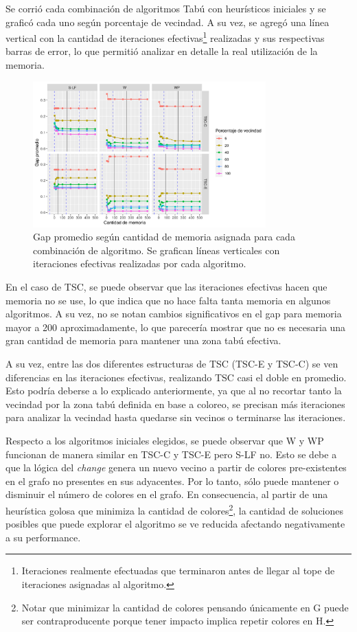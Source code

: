 Se corrió cada combinación de algoritmos Tabú con heurísticos iniciales y se graficó cada uno según porcentaje de vecindad. A su vez, se agregó una línea vertical con la cantidad de iteraciones efectivas\footnote{Iteraciones realmente efectuadas que terminaron antes de llegar al tope de iteraciones asignadas al algoritmo.} realizadas y sus respectivas barras de error, lo que permitió analizar en detalle la real utilización de la memoria.

\begin{figure}[H]
    \centering
    \includegraphics[width=0.8\textwidth]{plots/memoria_tsc.png}
    \caption{Gap promedio según cantidad de memoria asignada para cada combinación de algoritmo. Se grafican líneas verticales con iteraciones efectivas realizadas por cada algoritmo.}
    \label{plot:memoria tsc}
\end{figure}

En el caso de TSC, se puede observar que las iteraciones efectivas hacen que memoria no se use, lo que indica que no hace falta tanta memoria en algunos algoritmos. A su vez, no se notan cambios significativos en el gap para memoria mayor a 200 aproximadamente, lo que parecería mostrar que no es necesaria una gran cantidad de memoria para mantener una zona tabú efectiva.

A su vez, entre las dos diferentes estructuras de TSC (TSC-E y TSC-C) se ven diferencias en las iteraciones efectivas, realizando TSC casi el doble en promedio.  Esto podría deberse a lo explicado anteriormente, ya que al no recortar tanto la vecindad por la zona tabú definida en base a coloreo, se precisan más iteraciones para analizar la vecindad hasta quedarse sin vecinos o terminarse las iteraciones.

Respecto a los algoritmos iniciales elegidos, se puede observar que W y WP funcionan de manera similar en TSC-C y TSC-E pero S-LF no. Esto se debe a que la lógica del \textit{change} genera un nuevo vecino a partir de colores pre-existentes en el grafo no presentes en sus adyacentes. Por lo tanto, sólo puede mantener o disminuir el número de colores en el grafo. En consecuencia, al partir de una heurística golosa que minimiza la cantidad de colores\footnote{Notar que minimizar la cantidad de colores pensando únicamente en G puede ser contraproducente porque tener impacto implica repetir colores en H.}, la cantidad de soluciones posibles que puede explorar el algoritmo se ve reducida afectando negativamente a su performance.

